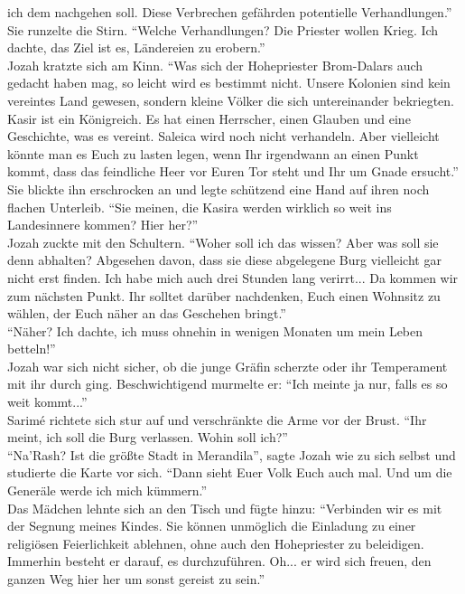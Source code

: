 ich dem nachgehen soll. Diese Verbrechen gefährden potentielle Verhandlungen.''\\
Sie runzelte die Stirn. ``Welche Verhandlungen? Die Priester wollen Krieg. Ich dachte, das Ziel ist 
es, Ländereien zu erobern.''\\
Jozah kratzte sich am Kinn. ``Was sich der Hohepriester Brom-Dalars auch gedacht haben mag, so 
leicht wird es bestimmt nicht. Unsere Kolonien sind kein vereintes Land gewesen, sondern kleine 
Völker die sich untereinander bekriegten. Kasir ist ein Königreich. Es hat einen Herrscher, 
einen Glauben und eine Geschichte, was es vereint. Saleica wird noch nicht verhandeln. Aber 
vielleicht könnte man es Euch zu lasten legen, wenn Ihr irgendwann an einen Punkt kommt, dass das 
feindliche Heer vor Euren Tor steht und Ihr um Gnade ersucht.''\\
Sie blickte ihn erschrocken an und legte schützend eine Hand auf ihren noch flachen Unterleib. 
``Sie meinen, die Kasira werden wirklich so weit ins Landesinnere kommen? Hier her?''\\
Jozah zuckte mit den Schultern. ``Woher soll ich das wissen? Aber was soll sie denn abhalten? 
Abgesehen davon, dass sie diese abgelegene Burg vielleicht gar nicht erst finden. Ich habe mich 
auch drei Stunden lang verirrt... Da kommen wir zum nächsten Punkt. Ihr solltet darüber nachdenken, 
Euch einen Wohnsitz zu wählen, der Euch näher an das Geschehen bringt.''\\
``Näher? Ich dachte, ich muss ohnehin in wenigen Monaten um mein Leben betteln!''\\
Jozah war sich nicht sicher, ob die junge Gräfin scherzte oder ihr Temperament mit ihr durch ging. 
Beschwichtigend murmelte er: ``Ich meinte ja nur, falls es so weit kommt...''\\
Sarimé richtete sich stur auf und verschränkte die Arme vor der Brust. ``Ihr meint, ich soll die 
Burg verlassen. Wohin soll ich?''\\
``Na'Rash? Ist die größte Stadt in Merandila'', sagte Jozah wie zu sich selbst und studierte die 
Karte vor sich. ``Dann sieht Euer Volk Euch auch mal. Und um die Generäle werde ich mich 
kümmern.''\\
Das Mädchen lehnte sich an den Tisch und fügte hinzu: ``Verbinden wir es mit der Segnung meines 
Kindes. Sie können unmöglich die Einladung zu einer religiösen Feierlichkeit ablehnen, ohne auch 
den Hohepriester zu beleidigen. Immerhin besteht er darauf, es durchzuführen. Oh... er wird sich 
freuen, den ganzen Weg hier her um sonst gereist zu sein.''\\
